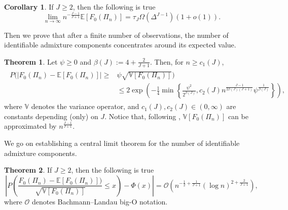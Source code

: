 \documentclass[12pt, reqno]{amsart}
\theoremstyle{definition}
\newtheorem{theorem}{Theorem}%
\newtheorem{corollary}{Corollary}[theorem]
\begin{document}
\begin{corollary}\label{exp_pois_growth}
If $J\geq 2$, then the following is true
$$\lim_{n\rightarrow\infty} n^{-\frac{J-1}{J+1}}\mathbb{E}[F_0(\Pi_n)] = \tau_J \Omega(\Delta^{J-1})\left(1+o(1)\right).$$
\end{corollary}
\fi 


Then we prove that after a finite number of observations, the number of identifiable admixture components concentrates around its expected value. 

\begin{theorem}\label{conc_ineq_pp}
Let $\psi\geq 0$ and $\beta(J):=4+\frac{2}{J+1}$. Then, for $n \geq c_1(J)$,
\begin{align}\label{conc_ineq_pp_eq}
\begin{split}
    P\bigg( \left| F_0(\Pi_n)-\mathbb{E}[F_0(\Pi_n)] \right| \geq &\psi \sqrt{\mathbb{V}[F_0(\Pi_n)]} \bigg)\\ &\leq 2 \exp \left( -\frac{1}{4} \min\left\lbrace{\frac{\psi^2}{2^{\beta(J)}},c_2(J) n^{\frac{J-1}{2\beta(J)(J+1)}}\psi^{\frac{1}{\beta(J)}}}\right\rbrace \right),
\end{split}
\end{align}
where $\mathbb{V}$ denotes the variance operator, and $c_1(J),c_2(J)\in(0,\infty)$ are constants depending (only) on $J$. Notice that, following \cite[Lemma 2]{reitzner1}, $\mathbb{V}[F_0(\Pi_n)]$ can be approximated by $n^{\frac{J-1}{J+1}}$.
\end{theorem}



We go on establishing a central limit theorem for the number of identifiable admixture components.

\begin{theorem}\label{clt_pois}
If $J\geq 2$, then the following is true
\begin{equation}\label{clt_pois_eq}
    \left| P\left( \frac{F_0(\Pi_n)-\mathbb{E}[F_0(\Pi_n)])}{\sqrt{\mathbb{V}[F_0(\Pi_n)]}} \leq x \right) - \Phi(x)\right| = \mathcal{O}\left( n^{-\frac{1}{2}+\frac{1}{J+1}}\left(\log n\right)^{2+\frac{2}{J+1}} \right),
\end{equation}
where $\mathcal{O}$ denotes Bachmann–Landau big-O notation.
\end{theorem}
\fi
\end{document}
